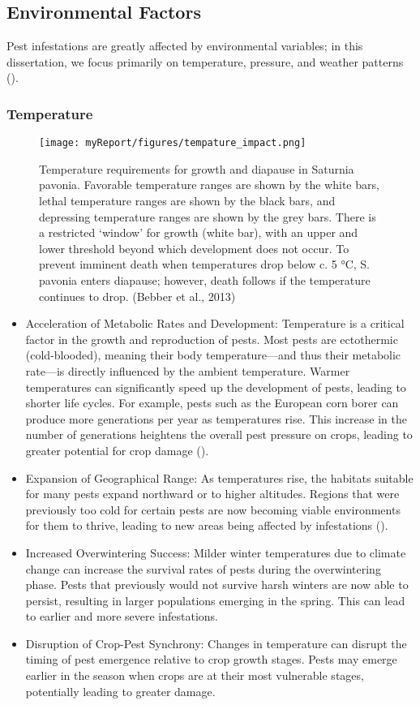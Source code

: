 \subsection{Environmental Factors}
Pest infestations are greatly affected by environmental variables; in this dissertation, we focus primarily on temperature, pressure, and weather patterns (\cite{prasadygbambawaleom_2014_effects, skendi_2021_the}). 
\subsubsection{Temperature}
\begin{figure}[ht]
        \texttt{[image: myReport/figures/tempature\_impact.png]}
        \caption{Temperature requirements for growth and diapause in
        Saturnia pavonia. Favorable temperature ranges are shown by the
        white bars, lethal temperature ranges are shown by the black bars,
        and depressing temperature ranges are shown by the grey bars.
        There is a restricted `window' for growth (white bar), with an upper and lower threshold beyond which development does not occur. To prevent imminent death when temperatures drop below c.
        5 °C, S. pavonia enters diapause; however, death follows if the temperature continues to drop. (Bebber et al., 2013)}
\end{figure}
        \begin{itemize}
        \item Acceleration of Metabolic Rates and Development: Temperature is a critical factor in the growth and reproduction of pests. Most pests are ectothermic (cold-blooded), meaning their body temperature—and thus their metabolic rate—is directly influenced by the ambient temperature. Warmer temperatures can significantly speed up the development of pests, leading to shorter life cycles. For example, pests such as the European corn borer can produce more generations per year as temperatures rise. This increase in the number of generations heightens the overall pest pressure on crops, leading to greater potential for crop damage (\cite{climate2}).
        \item  Expansion of Geographical Range: As temperatures rise, the habitats suitable for many pests expand northward or to higher altitudes. Regions that were previously too cold for certain pests are now becoming viable environments for them to thrive, leading to new areas being affected by infestations (\cite{climate2}).
        \item Increased Overwintering Success: Milder winter temperatures due to climate change can increase the survival rates of pests during the overwintering phase. Pests that previously would not survive harsh winters are now able to persist, resulting in larger populations emerging in the spring. This can lead to earlier and more severe infestations.
        \item Disruption of Crop-Pest Synchrony: Changes in temperature can disrupt the timing of pest emergence relative to crop growth stages. Pests may emerge earlier in the season when crops are at their most vulnerable stages, potentially leading to greater damage.
        \end{itemize}
      

